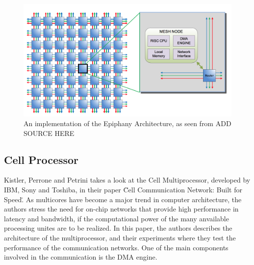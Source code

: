 \begin{figure}[h!]
    \centering
    \includegraphics[width=1\textwidth]{Figures/DMA/AdaptevaEpiphany}
    \caption{An implementation of the Epiphany Architecture, as seen from ADD SOURCE HERE}
    \label{fig:AdaptevaEpiphany}
\end{figure}


\subsection{Cell Processor}
Kistler, Perrone and Petrini takes a look at the Cell Multiprocessor, developed by IBM, Sony and Toshiba, in their paper  \"Cell Communication Network: Built for Speed\".
As multicores have become a major trend in computer architecture, the authors stress the need for on-chip networks that provide high performance in latency and bandwidth, if the computational power of the many anvailable processing unites are to be realized.
In this paper, the authors describes the architecture of the multiprocessor, and their experiments where they test the performance of the communication networks.
One of the main components involved in the communication is the DMA engine.

